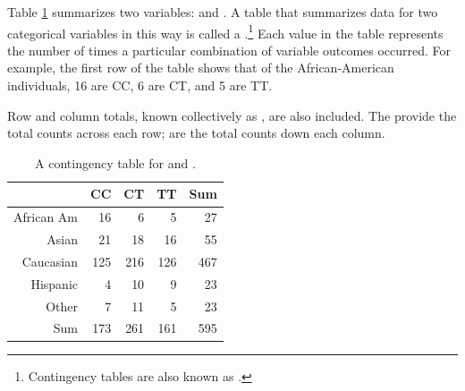 \begin{doublespace}

Table \ref{famussContingencyTable} summarizes two variables:  and . A table that summarizes data for two categorical variables in this way is called a .\footnote{Contingency tables are also known as .} Each value in the table represents the number of times a particular combination of variable outcomes occurred. For example, the first row of the table shows that of the African-American individuals, 16 are CC, 6 are CT, and 5 are TT. 

Row and column totals, known collectively as , are also included. The  provide the total counts across each row;  are the total counts down each column.

\begin{table}[ht]
	\centering
	\begin{tabular}{rrrrr}
		\hline
		& CC & CT & TT & Sum \\ 
		\hline
		African Am & 16 & 6 & 5 & 27 \\ 
		Asian & 21 & 18 & 16 & 55 \\ 
		Caucasian & 125 & 216 & 126 & 467 \\ 
		Hispanic & 4 & 10 & 9 & 23 \\ 
		Other & 7 & 11 & 5 & 23 \\ 
		Sum & 173 & 261 & 161 & 595 \\ 
		\hline
	\end{tabular}
	\caption{A contingency table for  and .} 
	\label{famussContingencyTable}
\end{table}


\end{doublespace}
